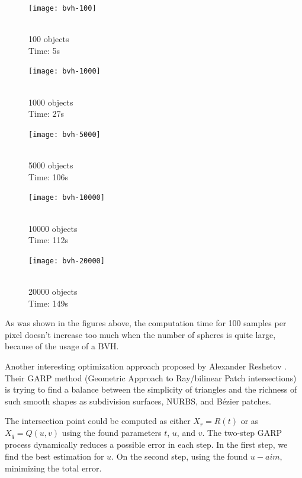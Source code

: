 \documentclass[12pt,a4paper,english]{article}
\begin{document}
\begin{multicols}{5}
    \begin{figure}[H]
        \texttt{[image: bvh-100]}
        \caption[]{\\100 objects\\Time: 5s}
        \label{fig:bvh-100}
    \end{figure}
    \columnbreak
    \begin{figure}[H]
        \texttt{[image: bvh-1000]}
        \caption[]{\\1000 objects\\Time: 27s}
        \label{fig:bvh-1000}
    \end{figure}
    \columnbreak
    \begin{figure}[H]
        \texttt{[image: bvh-5000]}
        \caption[]{\\5000 objects\\Time: 106s}
        \label{fig:bvh-5000}
    \end{figure}
    \columnbreak
    \begin{figure}[H]
        \texttt{[image: bvh-10000]}
        \caption[]{\\10000 objects\\Time: 112s}
        \label{fig:bvh-10000}
    \end{figure}
    \columnbreak
    \begin{figure}[H]
        \texttt{[image: bvh-20000]}
        \caption[]{\\20000 objects\\Time: 149s}
        \label{fig:bvh-20000}
    \end{figure}
\end{multicols}

As was shown in the figures above, the computation time for 100 samples per pixel doesn't increase too much when the number of spheres is quite large, because of the usage of a BVH.

Another interesting optimization approach proposed by Alexander Reshetov \cite{Reshetov_2019}. Their GARP method (Geometric Approach to Ray/bilinear Patch intersections) is trying to find a balance between the simplicity of triangles and the richness of such smooth shapes as subdivision surfaces, NURBS, and Bézier patches.

The intersection point could be computed as either $X_r = R(t)$ or as $X_q = Q(u, v)$ using the found parameters $t$, $u$, and $v$. The two-step GARP process dynamically reduces a possible error in each step. In the first step, we find the best estimation for $u$. On the second step, using the found $u-aim$, minimizing the total error.
\end{document}
